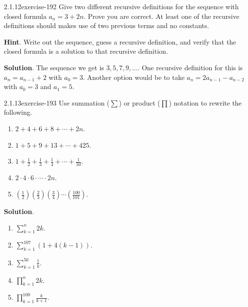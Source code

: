 \documentclass[twoside,11pt,]{book}
\numberwithin{equation}{chapter}
\renewcommand{\d}{\displaystyle}
\begin{document}
\begin{divisionsolution}{2.1.12}{}{exercise-192}%
\hypertarget{p-3037}{}%
Give two different recursive definitions for the sequence with closed formula \(a_n = 3 + 2n\).  Prove you are correct. At least one of the recursive definitions should makes use of two previous terms and no constants.%
\par\smallskip%
\noindent\textbf{Hint}.\quad%
\hypertarget{p-3038}{}%
Write out the sequence, guess a recursive definition, and verify that the closed formula is a solution to that recursive definition.%
\par\smallskip%
\noindent\textbf{Solution}.\quad%
\hypertarget{p-3039}{}%
The sequence we get is \(3, 5, 7, 9, \ldots\). One recursive definition for this is \(a_n = a_{n-1} + 2\) with \(a_0 = 3\). Another option would be to take \(a_n = 2a_{n-1} - a_{n-2}\) with \(a_0 = 3\) and \(a_1 = 5\).%
\end{divisionsolution}%
\begin{divisionsolution}{2.1.13}{}{exercise-193}%
\hypertarget{p-3040}{}%
Use summation (\(\sum\)) or product (\(\prod\)) notation to rewrite the following.\leavevmode%
\begin{multicols}{2}
\begin{enumerate}[label=(\alph*)]
\item\hypertarget{li-1781}{}\(2 + 4 + 6 + 8 + \cdots + 2n\).%
\item\hypertarget{li-1782}{}\(1 + 5 + 9 + 13 + \cdots + 425\).%
\item\hypertarget{li-1783}{}\(1 + \frac{1}{2} + \frac{1}{3} + \frac{1}{4} + \cdots + \frac{1}{50}\).%
\item\hypertarget{li-1784}{}\(2 \cdot 4 \cdot 6 \cdot \cdots \cdot 2n\).%
\item\hypertarget{li-1785}{}\((\frac{1}{2})(\frac{2}{3})(\frac{3}{4})\cdots(\frac{100}{101})\).%
\end{enumerate}
\end{multicols}
%
\par\smallskip%
\noindent\textbf{Solution}.\quad%
\hypertarget{p-3041}{}%
\leavevmode%
\begin{multicols}{2}
\begin{enumerate}[label=(\alph*)]
\item\hypertarget{li-1786}{}\(\d\sum_{k=1}^n 2k\).%
\item\hypertarget{li-1787}{}\(\d\sum_{k=1}^{107} (1 + 4(k-1))\).%
\item\hypertarget{li-1788}{}\(\d\sum_{k=1}^{50} \frac{1}{k}\).%
\item\hypertarget{li-1789}{}\(\d\prod_{k=1}^n 2k\).%
\item\hypertarget{li-1790}{}\(\d\prod_{k=1}^{100} \frac{k}{k+1}\).%
\end{enumerate}
\end{multicols}
%
\end{divisionsolution}%
\end{document}
